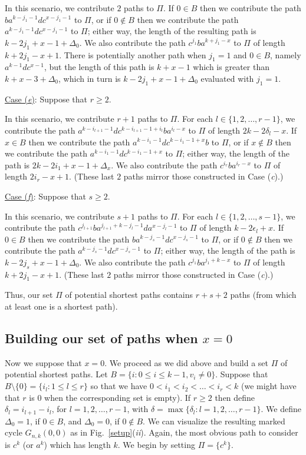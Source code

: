 \documentclass{article}
\begin{document}
\noindent In this scenario, we contribute $2$ paths to $\Pi$. If $0\in B$ then we contribute the path $ba^{k-j_1-1}dc^{x-j_1-1}$ to $\Pi$, or if $0\not\in B$ then we contribute the path $a^{k-j_1-1}dc^{x-j_1-1}$ to $\Pi$; either way, the length of the resulting path is $k-2j_1+x-1+\Delta_0$. We also contribute the path $c^{j_1}ba^{k+j_1-x}$ to $\Pi$ of length $k+2j_1-x+1$. There is potentially another path when $j_1=1$ and $0\in B$, namely $a^{k-1}dc^{x-1}$, but the length of this path is $k+x-1$ which is greater than $k+x-3+\Delta_0$, which in turn is $k-2j_1+x-1+\Delta_0$ evaluated with $j_1=1$.\smallskip

\noindent\underline{Case (\emph{e\/})}: Suppose that $r\geq 2$.\smallskip

\noindent In this scenario, we contribute $r+1$ paths to $\Pi$. For each $l\in\{1,2,\ldots,r-1\}$, we contribute the path $a^{k-i_{l+1}-1} dc^{k-i_{l+1}-1+i_l}ba^{i_l-x}$ to $\Pi$ of length $2k-2\delta_l-x$. If $x\in B$ then we contribute the path $a^{k-i_1-1}dc^{k-i_1-1+x}b$ to $\Pi$, or if $x\not\in B$ then we contribute the path $a^{k-i_1-1}dc^{k-i_1-1+x}$ to $\Pi$; either way, the length of the path is $2k-2i_1+x-1+\Delta_x$. We also contribute the path $c^{i_r}ba^{i_r-x}$ to $\Pi$ of length $2i_r-x+1$. (These last $2$ paths mirror those constructed in Case (\emph{c\/}).)\smallskip

\noindent\underline{Case (\emph{f\/})}: Suppose that $s\geq 2$.\smallskip

\noindent In this scenario, we contribute $s+1$ paths to $\Pi$. For each $l\in\{1,2,\ldots,s-1\}$, we contribute the path $c^{j_{l+1}} ba^{j_{l+1}+k-j_l-1}da^{x-j_l-1}$ to $\Pi$ of length $k-2\epsilon_l+x$. If $0\in B$ then we contribute the path $ba^{k-j_s-1}dc^{x-j_s-1}$ to $\Pi$, or if $0\not\in B$ then we contribute the path $a^{k-j_s-1}dc^{x-j_s-1}$ to $\Pi$; either way, the length of the path is $k-2j_s+x-1+\Delta_0$. We also contribute the path $c^{j_1}ba^{j_1+k-x}$ to $\Pi$ of length $k+2j_1-x+1$. (These last $2$ paths mirror those constructed in Case (\emph{c\/}).)\smallskip

Thus, our set $\Pi$ of potential shortest paths contains $r+s+2$ paths (from which at least one is a shortest path).

\subsection{Building our set of paths when $x = 0$}\label{samesourcedest}

Now we suppose that $x=0$. We proceed as we did above and build a set $\Pi$ of potential shortest paths. Let $B=\{i: 0\leq i\leq k-1, v_i\neq 0\}$. Suppose that $B\setminus\{0\} = \{i_l: 1 \leq l \leq r\}$ so that we have $0 < i_1 < i_2 < \ldots < i_r < k$ (we might have that $r$ is $0$ when the corresponding set is empty). If $r \geq 2$ then define $\delta_l = i_{l+1}-i_l$, for $l=1,2,\ldots,r-1$, with $\delta=\max\{\delta_l:l=1,2,\ldots,r-1\}$. We define $\Delta_0=1$, if $0\in B$, and $\Delta_0=0$, if $0\not\in B$. We can visualize the resulting marked cycle $G_{n,k}(0,0)$ as in Fig.~\ref{setup}(\emph{ii\/}). Again, the most obvious path to consider is $c^k$ (or $a^k$) which has length $k$. We begin by setting $\Pi=\{c^k\}$. \smallskip
\end{document}
